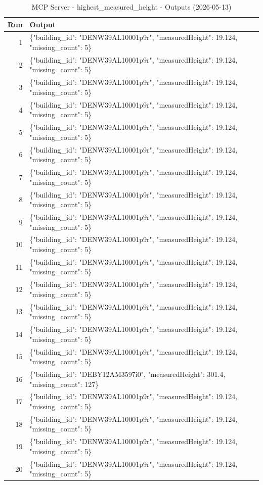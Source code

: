 \documentclass[a4paper,11pt]{article}
\begin{document}
\begin{table}[ht]
\centering
\scriptsize
\caption{MCP Server - highest\_measured\_height - Outputs (2026-05-13)}
\label{tab:mcp\_highest\_measured\_height\_outputs\_2026-05-13}
\begin{tabular}{r p{12cm}}
\hline
Run & Output \\
\hline
1 & \{"building\_id": "DENW39AL10001p9r", "measuredHeight": 19.124, "missing\_count": 5\} \\
2 & \{"building\_id": "DENW39AL10001p9r", "measuredHeight": 19.124, "missing\_count": 5\} \\
3 & \{"building\_id": "DENW39AL10001p9r", "measuredHeight": 19.124, "missing\_count": 5\} \\
4 & \{"building\_id": "DENW39AL10001p9r", "measuredHeight": 19.124, "missing\_count": 5\} \\
5 & \{"building\_id": "DENW39AL10001p9r", "measuredHeight": 19.124, "missing\_count": 5\} \\
6 & \{"building\_id": "DENW39AL10001p9r", "measuredHeight": 19.124, "missing\_count": 5\} \\
7 & \{"building\_id": "DENW39AL10001p9r", "measuredHeight": 19.124, "missing\_count": 5\} \\
8 & \{"building\_id": "DENW39AL10001p9r", "measuredHeight": 19.124, "missing\_count": 5\} \\
9 & \{"building\_id": "DENW39AL10001p9r", "measuredHeight": 19.124, "missing\_count": 5\} \\
10 & \{"building\_id": "DENW39AL10001p9r", "measuredHeight": 19.124, "missing\_count": 5\} \\
11 & \{"building\_id": "DENW39AL10001p9r", "measuredHeight": 19.124, "missing\_count": 5\} \\
12 & \{"building\_id": "DENW39AL10001p9r", "measuredHeight": 19.124, "missing\_count": 5\} \\
13 & \{"building\_id": "DENW39AL10001p9r", "measuredHeight": 19.124, "missing\_count": 5\} \\
14 & \{"building\_id": "DENW39AL10001p9r", "measuredHeight": 19.124, "missing\_count": 5\} \\
15 & \{"building\_id": "DENW39AL10001p9r", "measuredHeight": 19.124, "missing\_count": 5\} \\
16 & \{"building\_id": "DEBY12AM3597i0", "measuredHeight": 301.4, "missing\_count": 127\} \\
17 & \{"building\_id": "DENW39AL10001p9r", "measuredHeight": 19.124, "missing\_count": 5\} \\
18 & \{"building\_id": "DENW39AL10001p9r", "measuredHeight": 19.124, "missing\_count": 5\} \\
19 & \{"building\_id": "DENW39AL10001p9r", "measuredHeight": 19.124, "missing\_count": 5\} \\
20 & \{"building\_id": "DENW39AL10001p9r", "measuredHeight": 19.124, "missing\_count": 5\} \\
\hline
\end{tabular}
\end{table}
\end{document}
